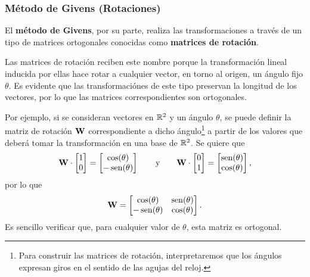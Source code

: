 
\subsubsection{Método de Givens (Rotaciones)}
El \textbf{método de Givens}, por su parte, realiza las transformaciones
a través de un tipo de matrices ortogonales conocidas como
\textbf{matrices de rotación}.

Las matrices de rotación reciben este nombre porque la transformación
lineal inducida por ellas hace rotar a cualquier vector, en torno al origen,
un ángulo fijo $\theta$. Es evidente que las transformaciónes de este tipo
preservan la longitud de los vectores, por lo que las matrices
correspondientes son ortogonales.

Por ejemplo, si se consideran vectores en $\mathbb{R}^2$ y un ángulo $\theta$,
se puede definir la matriz de rotación $\mathbf{W}$ correspondiente a dicho
ángulo\footnote{Para construir las matrices de rotación, interpretaremos
que los ángulos expresan giros en el sentido de las agujas del reloj.}
a partir de los valores que deberá tomar la transformación en una base de
$\mathbb{R}^2$.
Se quiere que
\[
\mathbf{W} \cdot \begin{bmatrix} 1 \\ 0 \end{bmatrix} =
    \begin{bmatrix}\cos(\theta) \\ -\operatorname{sen}(\theta) \end{bmatrix}
\qquad \text{y} \qquad
\mathbf{W} \cdot \begin{bmatrix} 0 \\ 1 \end{bmatrix} =
    \begin{bmatrix}\operatorname{sen}(\theta) \\ \cos(\theta) \end{bmatrix},
\]
por lo que
\[
\mathbf{W} = \begin{bmatrix}
    \cos(\theta)   & \operatorname{sen}(\theta) \\
    - \operatorname{sen}(\theta) & \cos(\theta)
\end{bmatrix}.
\]
Es sencillo verificar que, para cualquier valor de $\theta$, esta matriz es
ortogonal.

